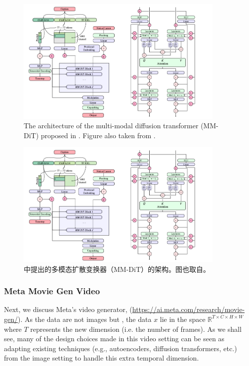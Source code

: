 \begin{figure}[!t]
    \centering
    \includegraphics[width=0.9\textwidth]{figures/mmdit.png}
    \caption{The architecture of the multi-modal diffusion transformer (MM-DiT) proposed in \citep{sd3}. Figure also taken from \citep{sd3}.}
    \label{fig:mmdit}
\end{figure}

\begin{figure}[!t]
    \centering
    \includegraphics[width=0.9\textwidth]{figures/mmdit.png}
    \caption{\citep{sd3}中提出的多模态扩散变换器（MM-DiT）的架构。图也取自\citep{sd3}。}
    \label{fig:mmdit}
\end{figure}


\subsubsection{Meta Movie Gen Video}
Next, we discuss Meta's video generator,  (\url{https://ai.meta.com/research/movie-gen/}). As the data are not images but ,  the data $x$ lie in the space $\mathbb{R}^{T \times C \times H \times W}$ where $T$ represents the new  dimension (i.e. the number of frames). As we shall see, many of the design choices made in this video setting can be seen as adapting existing techniques (e.g., autoencoders, diffusion transformers, etc.) from the image setting to handle this extra temporal dimension.\\

